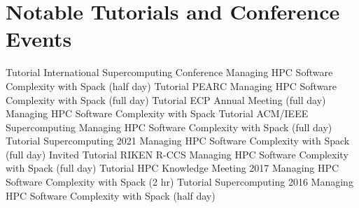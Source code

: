 \section{Notable Tutorials and Conference Events}
		{Tutorial}
		{International Supercomputing Conference}{}
		{Managing HPC Software Complexity with Spack (half day)}{}
		{Tutorial}
		{PEARC}{}
		{Managing HPC Software Complexity with Spack (full day)}{}
		{Tutorial}
		{ECP Annual Meeting (full day)}{}
		{Managing HPC Software Complexity with Spack}{}
		{Tutorial}
		{ACM/IEEE Supercomputing}{}
		{Managing HPC Software Complexity with Spack (full day)}{}
		{Tutorial}
		{Supercomputing 2021}{}
		{Managing HPC Software Complexity with Spack (full day)}{}
		{Invited Tutorial}
		{RIKEN R-CCS}{}
		{Managing HPC Software Complexity with Spack (full day)}{}
		{Tutorial}
		{HPC Knowledge Meeting 2017}{}
		{Managing HPC Software Complexity with Spack (2 hr)}{}
		{Tutorial}
		{Supercomputing 2016}{}
		{Managing HPC Software Complexity with Spack (half day)}{}
